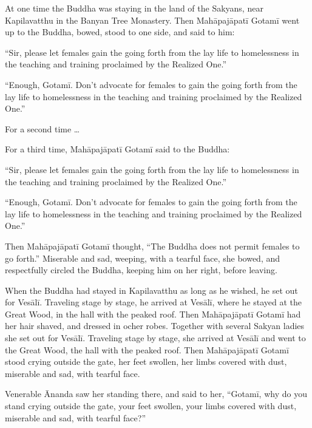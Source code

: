 \documentclass[12pt,openany]{book}%
\begin{document}
At one time the Buddha was staying in the land of the Sakyans, near Kapilavatthu in the Banyan Tree Monastery. Then \textsanskrit{Mahāpajāpatī} \textsanskrit{Gotamī} went up to the Buddha, bowed, stood to one side, and said to him: 

“Sir, please let females gain the going forth from the lay life to homelessness in the teaching and training proclaimed by the Realized One.” 

“Enough, \textsanskrit{Gotamī}. Don’t advocate for females to gain the going forth from the lay life to homelessness in the teaching and training proclaimed by the Realized One.” 

For a second time … 

For a third time, \textsanskrit{Mahāpajāpatī} \textsanskrit{Gotamī} said to the Buddha: 

“Sir, please let females gain the going forth from the lay life to homelessness in the teaching and training proclaimed by the Realized One.” 

“Enough, \textsanskrit{Gotamī}. Don’t advocate for females to gain the going forth from the lay life to homelessness in the teaching and training proclaimed by the Realized One.” 

Then \textsanskrit{Mahāpajāpatī} \textsanskrit{Gotamī} thought, “The Buddha does not permit females to go forth.” Miserable and sad, weeping, with a tearful face, she bowed, and respectfully circled the Buddha, keeping him on her right, before leaving. 

When the Buddha had stayed in Kapilavatthu as long as he wished, he set out for \textsanskrit{Vesālī}. Traveling stage by stage, he arrived at \textsanskrit{Vesālī}, where he stayed at the Great Wood, in the hall with the peaked roof. Then \textsanskrit{Mahāpajāpatī} \textsanskrit{Gotamī} had her hair shaved, and dressed in ocher robes. Together with several Sakyan ladies she set out for \textsanskrit{Vesālī}. Traveling stage by stage, she arrived at \textsanskrit{Vesālī} and went to the Great Wood, the hall with the peaked roof. Then \textsanskrit{Mahāpajāpatī} \textsanskrit{Gotamī} stood crying outside the gate, her feet swollen, her limbs covered with dust, miserable and sad, with tearful face. 

Venerable Ānanda saw her standing there, and said to her, “\textsanskrit{Gotamī}, why do you stand crying outside the gate, your feet swollen, your limbs covered with dust, miserable and sad, with tearful face?” 
\end{document}
